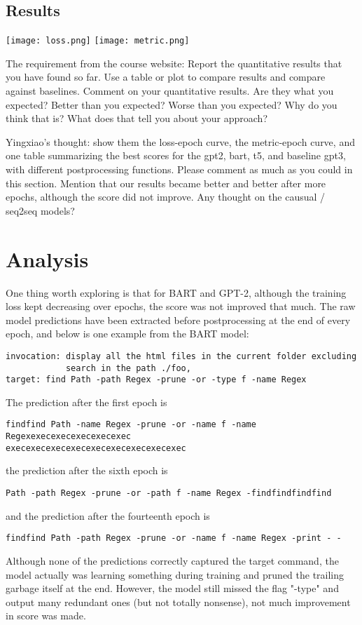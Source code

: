 \documentclass{article}
\begin{document}
\color{red}
\subsection{Results}
\color{black}

\begin{center}
	\texttt{[image: loss.png]}
	\texttt{[image: metric.png]}
\end{center}
The requirement from the course website: Report the quantitative results that you have found so far. Use a table or plot to compare results and compare against baselines.
Comment on your quantitative results. Are they what you expected? Better than you expected? Worse than you expected? Why do you think that is? What does that tell you about your approach?

Yingxiao's thought: show them the loss-epoch curve, the metric-epoch curve, and one table summarizing the best scores for the gpt2, bart, t5, and baseline gpt3, with different postprocessing functions. Please comment as much as you could in this section. Mention that our results became better and better after more epochs, although the score did not improve. Any thought on the causual / seq2seq models?


\section{Analysis}
One thing worth exploring is that for BART and GPT-2, although the training loss kept decreasing over epochs, the score was not improved that much. The raw model predictions have been extracted before postprocessing at the end of every epoch, and below is one example from the BART model:
\begin{verbatim}
invocation: display all the html files in the current folder excluding 
            search in the path ./foo,
target: find Path -path Regex -prune -or -type f -name Regex
\end{verbatim}
The prediction after the first epoch is
\begin{verbatim}
findfind Path -name Regex -prune -or -name f -name Regexexecexecexecexecexec
execexecexecexecexecexecexecexecexec
\end{verbatim}
the prediction after the sixth epoch is
\begin{verbatim}
Path -path Regex -prune -or -path f -name Regex -findfindfindfind
\end{verbatim}
and the prediction after the fourteenth epoch is
\begin{verbatim}
findfind Path -path Regex -prune -or -name f -name Regex -print - -
\end{verbatim}
Although none of the predictions correctly captured the target command, the model actually was learning something during training and pruned the trailing garbage itself at the end. However, the model still missed the flag "-type" and output many redundant ones (but not totally nonsense), not much improvement in score was made.
\end{document}
